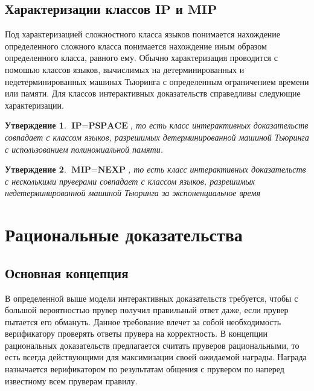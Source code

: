 \documentclass[14pt, a4paper, russian]{report}
\newtheorem{proposition}{\indent Утверждение}
\begin{document}
\section{Характеризации классов $\textbf{IP}$ и $\textbf{MIP}$}
Под характеризацией сложностного класса языков понимается нахождение определенного сложного класса понимается нахождение иным образом определенного класса, равного ему. Обычно характеризация проводится с помошью классов языков, вычислимых на детерминированных и недетерминированных машинах Тьюринга с определенным ограничением времени или памяти. Для классов интерактивных доказательств справедливы следующие характеризации.
\begin{proposition}$\textbf{IP} = \textbf{PSPACE}$, то есть класс интерактивных доказательств совпадает с классом языков, разрешимых детерминированной машиной Тьюринга с использованием полиномиальной памяти. \cite{sha}
\end{proposition}
\begin{proposition}$\textbf{MIP} = \textbf{NEXP}$, то есть класс интерактивных доказательств с несколькими пруверами совпадает с классом языков, разрешимых недетерминированной машиной Тьюринга за экспоненциальное время \cite{babai1991mip}\end{proposition}

\chapter{Рациональные доказательства}
\section{Основная концепция}
В определенной выше модели интерактивных доказательств требуется, чтобы с большой вероятностью прувер получил правильный ответ даже, если прувер пытается его обмануть. Данное требование влечет за собой необходимость верификатору проверять ответы прувера на корректность. В концепции рациональных доказательств предлагается считать пруверов рациональными, то есть всегда действующими для максимизации своей ожидаемой награды. Награда назначается верификатором по результатам общения с прувером по наперед известному всем пруверам правилу. 
\end{document}
